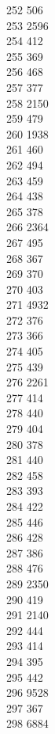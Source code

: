 { 252	506 \\
 253	2596 \\
 254	412 \\
 255	369 \\
 256	468 \\
 257	377 \\
 258	2150 \\
 259	479 \\
 260	1938 \\
 261	460 \\
 262	494 \\
 263	459 \\
 264	438 \\
 265	378 \\
 266	2364 \\
 267	495 \\
 268	367 \\
 269	370 \\
 270	403 \\
 271	4932 \\
 272	376 \\
 273	366 \\
 274	405 \\
 275	439 \\
 276	2261 \\
 277	414 \\
 278	440 \\
 279	404 \\
 280	378 \\
 281	440 \\
 282	458 \\
 283	393 \\
 284	422 \\
 285	446 \\
 286	428 \\
 287	386 \\
 288	476 \\
 289	2350 \\
 290	419 \\
 291	2140 \\
 292	444 \\
 293	414 \\
 294	395 \\
 295	442 \\
 296	9528 \\
 297	367 \\
 298	6884 \\
}
